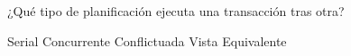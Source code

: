 \question[1] ¿Qué tipo de planificación ejecuta una transacción tras otra?
\begin{choices}
\CorrectChoice Serial
\choice Concurrente
\choice Conflictuada
\choice Vista Equivalente
\end{choices}